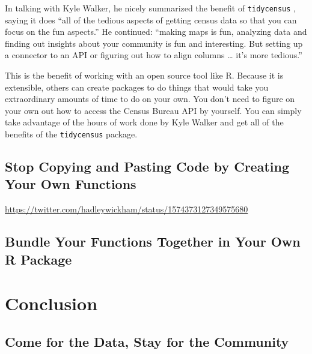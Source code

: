 \documentclass[
]{book}
\begin{document}
In talking with Kyle Walker, he nicely summarized the benefit of \texttt{tidycensus} , saying it does ``all of the tedious aspects of getting census data so that you can focus on the fun aspects.'' He continued: ``making maps is fun, analyzing data and finding out insights about your community is fun and interesting. But setting up a connector to an API or figuring out how to align columns \ldots{} it's more tedious.''

This is the benefit of working with an open source tool like R. Because it is extensible, others can create packages to do things that would take you extraordinary amounts of time to do on your own. You don't need to figure on your own out how to access the Census Bureau API by yourself. You can simply take advantage of the hours of work done by Kyle Walker and get all of the benefits of the \texttt{tidycensus} package.

\hypertarget{functions}{%
\chapter{Stop Copying and Pasting Code by Creating Your Own Functions}\label{functions}}

\url{https://twitter.com/hadleywickham/status/1574373127349575680}

\hypertarget{custom-packages}{%
\chapter{Bundle Your Functions Together in Your Own R Package}\label{custom-packages}}

\hypertarget{part-conclusion}{%
\part*{Conclusion}\label{part-conclusion}}

\hypertarget{come-for-the-data-stay-for-the-community}{%
\chapter{Come for the Data, Stay for the Community}\label{come-for-the-data-stay-for-the-community}}
\end{document}
